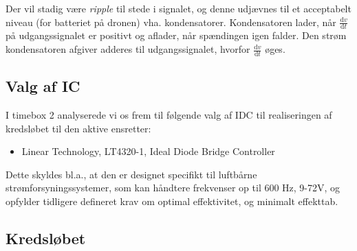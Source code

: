 Der vil stadig være \textit{ripple} til stede i signalet, og denne udjævnes til et acceptabelt niveau (for batteriet på dronen) vha. kondensatorer. Kondensatoren lader, når $\frac{\mathrm{d}v}{\mathrm{d}t}$ på udgangssignalet er positivt og aflader, når spændingen igen falder. Den strøm kondensatoren afgiver adderes til udgangssignalet, hvorfor $\frac{\mathrm{d}v}{\mathrm{d}t}$ øges.

\subsection{Valg af IC }
\label{sec:valg-af-ic}

I timebox 2 analyserede vi os frem til følgende valg af IDC til realiseringen af kredsløbet til den aktive ensretter:
\begin{itemize}
\item Linear Technology, LT4320-1, Ideal Diode Bridge Controller
\end{itemize}

Dette skyldes bl.a., at den er designet specifikt til luftbårne strømforsyningssystemer, som kan håndtere frekvenser op til 600 Hz, 9-72V, og opfylder tidligere defineret krav om optimal effektivitet, og minimalt effekttab.

\clearpage
\subsection{Kredsløbet}
\label{sec:kredslobet}

